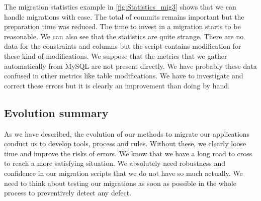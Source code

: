The migration statistics example in \autoref{fig:Statistics_mig3} shows that we can handle migrations with ease. The total of commits remains important but the preparation time was reduced. The time to invest in a migration starts to be reasonable. We can also see that the statistics are quite strange. There are no data for the constraints and columns but the script contains modification for these kind of modifications. We suppose that the metrics that we gather automatically from MySQL are not present directly. We have probably these data confused in other metrics like table modifications. We have to investigate and correct these errors but it is clearly an improvement than doing by hand.

\subsection{Evolution summary}

As we have described, the evolution of our methods to migrate our applications conduct us to develop tools, process and rules. Without these, we clearly loose time and improve the risks of errors. We know that we have a long road to cross to reach a more satisfying situation. We absolutely need robustness and confidence in our migration scripts that we do not have so much actually. We need to think about testing our migrations as soon as possible in the whole process to preventively detect any defect.





